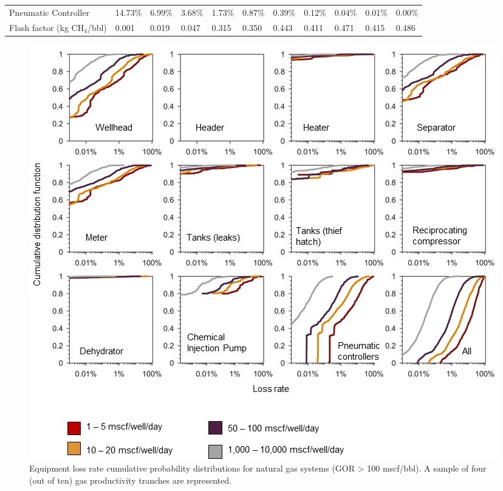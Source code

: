 \documentclass[11pt]{report}
\begin{document}
\begin{landscape}
\begin{table}
\begin{scriptsize}
\begin{threeparttable}
\begin{tabular}{lllllllllll}
Pneumatic Controller    & 14.73\% & 6.99\%  & 3.68\%  & 1.73\%  & 0.87\%  & 0.39\%  & 0.12\%  & 0.04\%  & 0.01\%  & 0.00\%  \\
Flash factor (kg CH$_4$/bbl)            & 0.001  & 0.019  & 0.047  & 0.315 & 0.350 & 0.443 & 0.411 & 0.471 & 0.415 & 0.486\\
\bottomrule
\end{tabular}
\begin{tablenotes}
\item[] 
\end{tablenotes}
\end{threeparttable}
\end{scriptsize}
\end{table}
\end{landscape}


 \begin{figure}[t]
\includegraphics[width=1\columnwidth]{images/VF_dists_gas.jpg}
\caption{Equipment loss rate cumulative probability distributions for natural gas systems (GOR > 100 mscf/bbl). A sample of four (out of ten) gas productivity tranches are represented.}
\label{fig:VF_dists_gas}
\end{figure}  
\end{document}
